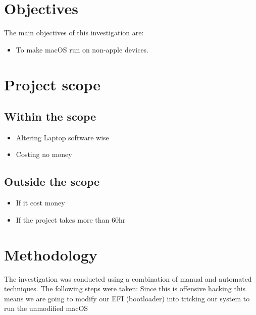 \documentclass[12pt, letterpaper]{article}
\begin{document}


\newpage

\section{Objectives}
The main objectives of this investigation are:
\begin{itemize}
    \item To make macOS run on non-apple devices.
\end{itemize}
\section{Project scope}
\subsection{Within the scope}
\begin{itemize}
    \item Altering Laptop software wise
    \item Costing no money
    
\end{itemize}
\subsection{Outside the scope}
\begin{itemize}
    \item If it cost money
    \item If the project takes more than 60hr
\end{itemize}
\newpage
\section{Methodology}
The investigation was conducted using a combination of manual and automated techniques. The following steps were taken:
\hfill\break
\hfill\break
Since this is offensive hacking this means we are going to modify our EFI (bootloader) into tricking our system to run the unmodified macOS
\end{document}
